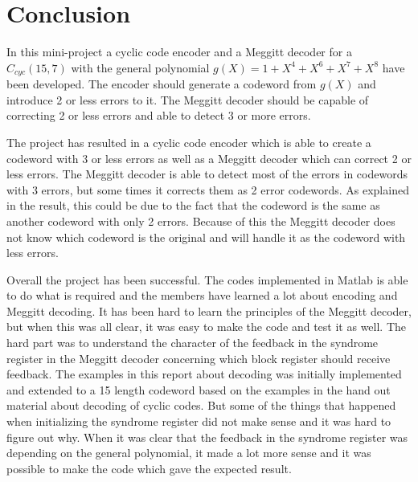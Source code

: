 \documentclass[Main]{subfiles}
\begin{document}
\section{Conclusion}
In this mini-project a cyclic code encoder and a Meggitt decoder for a $C_{cyc}(15,7)$ with the general polynomial $g(X)=1+X^4+X^6+X^7+X^8$ have been developed.
The encoder should generate a codeword from $g(X)$ and introduce 2 or less errors to it.
The Meggitt decoder should be capable of correcting 2 or less errors and able to detect 3 or more errors.

The project has resulted in a cyclic code encoder which is able to create a codeword with 3 or less errors as well as a Meggitt decoder which can correct 2 or less errors.
The Meggitt decoder is able to detect most of the errors in codewords with 3 errors, but some times it corrects them as 2 error codewords.
As explained in the result, this could be due to the fact that the codeword is the same as another codeword with only 2 errors. Because of this the Meggitt decoder does not know which codeword is the original and will handle it as the codeword with less errors.  

Overall the project has been successful.
The codes implemented in Matlab is able to do what is required and the members have learned a lot about encoding and Meggitt decoding.
It has been hard to learn the principles of the Meggitt decoder, but when this was all clear, it was easy to make the code and test it as well.
The hard part was to understand the character of the feedback in the syndrome register in the Meggitt decoder concerning which block register should receive feedback.
The examples in this report about decoding was initially implemented and extended to a 15 length codeword based on the examples in the hand out material about decoding of cyclic codes.
But some of the things that happened when initializing the syndrome register did not make sense and it was hard to figure out why.
When it was clear that the feedback in the syndrome register was depending on the general polynomial, it made a lot more sense and it was possible to make the code which gave the expected result.
\end{document}
